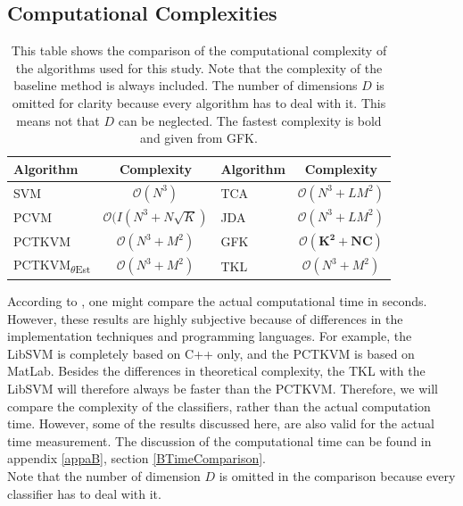 \subsection{Computational Complexities}\label{EmSubSecTimeResults}
\FloatBarrier
\begin{table}[t]
	\centering
	\begin{tabular}{@{}lclc@{}}
		\toprule
		Algorithm & Complexity & Algorithm & Complexity \\ \midrule
		\acs{SVM}       &    $\mathcal{O}(N^3)$         & \acs{TCA}       &  $\mathcal{O}(N^3+LM^2)$          \\
		\acs{PCVM}      &  $\mathcal{O}(I(N^3+N\sqrt{K})$           & \acs{JDA}      & $\mathcal{O}(N^3+LM^2)$       \\
		\acs{PCTKVM}    &     $\mathcal{O}(N^3+M^2)$        & \acs{GFK}       &  $\mathbf{\mathcal{O}(K^2+NC)}$          \\
		\acs{PCTKVM}\textsubscript{$\theta$Est}    &  $\mathcal{O}(N^3+M^2)$           & \acs{TKL}       &  $\mathcal{O}(N^3+M^2)$          \\ \bottomrule
	\end{tabular}
	\caption[Comparison of Computational Complexities]{This table shows the comparison of the computational complexity of the algorithms used for this study. Note that the complexity of the baseline method is always included. The number of dimensions $D$ is omitted for clarity because every algorithm has to deal with it. This means not that $D$ can be neglected. The fastest complexity is bold and given from \acs{GFK}.\label{TableCompCom}}
\end{table}
According to \cite{Chen.2009}, one might compare the actual computational time in seconds.
However, these results are highly subjective because of differences in the implementation techniques and programming languages.
For example, the LibSVM is completely based on C++ only, and the \acs{PCTKVM} is based on MatLab. 
Besides the differences in theoretical complexity, the \acs{TKL} with the LibSVM will therefore always be faster than the \acs{PCTKVM}.
Therefore, we will compare the complexity of the classifiers, rather than the actual computation time.
However, some of the results discussed here, are also valid for the actual time measurement. 
The discussion of the computational time can be found in appendix \ref{appaB}, section \ref{BTimeComparison}.\\
Note that the number of dimension $D$ is omitted in the comparison because every classifier has to deal with it.
